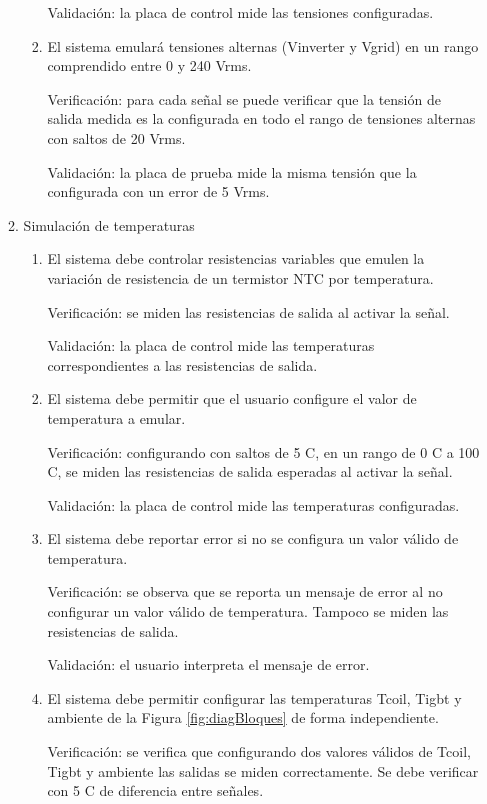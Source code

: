 \documentclass[
11pt, %
codirector, %
]{charter}
\begin{document}
\begin{enumerate}
\begin{enumerate}
\begin{enumerate}
			                  Validación: la placa de control mide las tensiones configuradas.
			            \item El sistema emulará tensiones alternas (Vinverter y Vgrid) en un rango comprendido entre 0 y 240 Vrms.

			                  Verificación: para cada señal se puede verificar que la tensión de salida medida es la configurada en todo el rango de tensiones alternas con saltos de 20 Vrms.

			                  Validación: la placa de prueba mide la misma tensión que la configurada con un error de 5 Vrms.
		            \end{enumerate}
		      \item Simulación de temperaturas
		            \begin{enumerate}
			            \item El sistema debe controlar resistencias variables que emulen la variación de resistencia de un termistor NTC por temperatura.

			                  Verificación: se miden las resistencias de salida al activar la señal.

			                  Validación: la placa de control mide las temperaturas correspondientes a las resistencias de salida.
			            \item El sistema debe permitir que el usuario configure el valor de temperatura a emular.

			                  Verificación: configurando con saltos de 5 C, en un rango de 0 C a 100 C, se miden las resistencias de salida esperadas al activar la señal.

			                  Validación: la placa de control mide las temperaturas configuradas.
			            \item El sistema debe reportar error si no se configura un valor válido de temperatura.

			                  Verificación: se observa que se reporta un mensaje de error al no configurar un valor válido de temperatura. Tampoco se miden las resistencias de salida.

			                  Validación: el usuario interpreta el mensaje de error.
			            \item El sistema debe permitir configurar las temperaturas Tcoil, Tigbt y ambiente de la Figura \ref{fig:diagBloques} de forma independiente.

			                  Verificación: se verifica que configurando dos valores válidos de Tcoil, Tigbt y ambiente las salidas se miden correctamente. Se debe verificar con 5 C de diferencia entre señales.


\end{enumerate}
\end{enumerate}
\end{enumerate}
\end{document}

